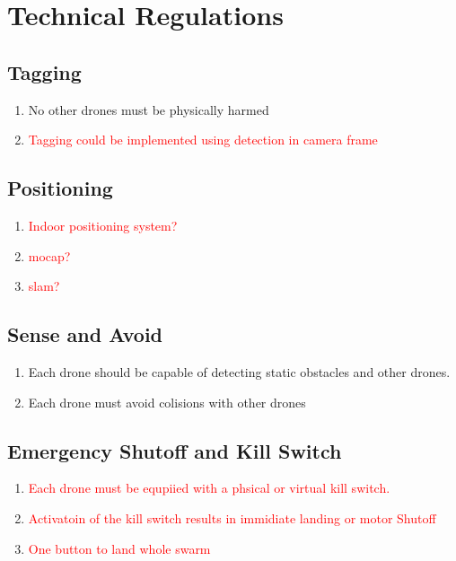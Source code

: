 \section{Technical Regulations}
\subsection{Tagging}
\begin{enumerate}
	\item{No other drones must be physically harmed}
	\item{\textcolor{red}{Tagging could be implemented using detection in camera frame}}
\end{enumerate}

\subsection{Positioning}
\begin{enumerate}
	\item{\textcolor{red}{Indoor positioning system?}}
	\item{\textcolor{red}{mocap?}}
	\item{\textcolor{red}{slam?}}

\end{enumerate}

\subsection{Sense and Avoid}
\begin{enumerate}
	\item{Each drone should be capable of detecting static obstacles and other drones.}
	\item{Each drone must avoid colisions with other drones}
\end{enumerate}

\subsection{Emergency Shutoff and Kill Switch}
\begin{enumerate}
	\item{\textcolor{red}{Each drone must be equpiied with a phsical or virtual kill switch.}}
	\item{\textcolor{red}{Activatoin of the kill switch results in immidiate landing or motor Shutoff}}
	\item{\textcolor{red}{One button to land whole swarm}}
\end{enumerate}

